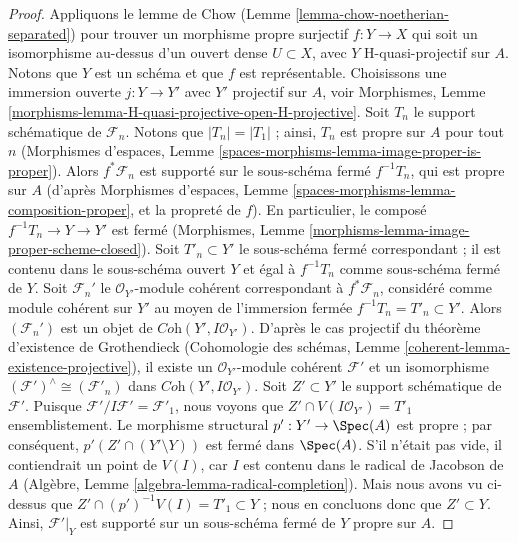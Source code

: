 \begin{proof}
\medskip\noindent
Appliquons le lemme de Chow (Lemme \ref{lemma-chow-noetherian-separated})
pour trouver un morphisme propre surjectif $f : Y \to X$ qui soit un isomorphisme
au-dessus d'un ouvert dense $U \subset X$, avec $Y$ H-quasi-projectif
sur $A$. Notons que $Y$ est un schéma et que $f$ est représentable.
Choisissons une immersion ouverte $j : Y \to Y'$ avec $Y'$ projectif sur $A$, voir
Morphismes, Lemme \ref{morphisms-lemma-H-quasi-projective-open-H-projective}.
Soit $T_n$ le support schématique de $\mathcal{F}_n$.
Notons que $|T_n| = |T_1|$ ; ainsi, $T_n$ est propre sur $A$ pour tout $n$
(Morphismes d'espaces, Lemme
\ref{spaces-morphisms-lemma-image-proper-is-proper}).
Alors $f^*\mathcal{F}_n$ est supporté sur le sous-schéma fermé
$f^{-1}T_n$, qui est propre sur $A$ (d'après
Morphismes d'espaces, Lemme \ref{spaces-morphisms-lemma-composition-proper},
et la propreté de $f$).
En particulier, le composé $f^{-1}T_n \to Y \to Y'$ est fermé
(Morphismes, Lemme \ref{morphisms-lemma-image-proper-scheme-closed}).
Soit $T'_n \subset Y'$ le sous-schéma fermé correspondant ;
il est contenu dans le sous-schéma ouvert $Y$ et égal à $f^{-1}T_n$
comme sous-schéma fermé de $Y$. Soit $\mathcal{F}_n'$
le $\mathcal{O}_{Y'}$-module cohérent correspondant à
$f^*\mathcal{F}_n$, considéré comme module cohérent sur $Y'$ au moyen de
l'immersion fermée $f^{-1}T_n = T'_n \subset Y'$.
Alors $(\mathcal{F}_n')$
est un objet de $\textit{Coh}(Y', I\mathcal{O}_{Y'})$.
D'après le cas projectif du théorème d'existence de Grothendieck
(Cohomologie des schémas, Lemme \ref{coherent-lemma-existence-projective}),
il existe un $\mathcal{O}_{Y'}$-module cohérent
$\mathcal{F}'$ et un isomorphisme
$(\mathcal{F}')^\wedge \cong (\mathcal{F}'_n)$ dans
$\textit{Coh}(Y', I\mathcal{O}_{Y'})$.
Soit $Z' \subset Y'$ le support schématique de $\mathcal{F}'$.
Puisque $\mathcal{F}'/I\mathcal{F}' = \mathcal{F}'_1$, nous voyons
que $Z' \cap V(I\mathcal{O}_{Y'}) = T'_1$ ensemblistement.
Le morphisme structural $p' : Y' \to \Spec(A)$ est propre ; par conséquent,
$p'(Z' \cap (Y' \setminus Y))$ est fermé dans $\Spec(A)$.
S'il n'était pas vide, il contiendrait un point de $V(I)$,
car $I$ est contenu dans le radical de Jacobson de $A$
(Algèbre, Lemme \ref{algebra-lemma-radical-completion}).
Mais nous avons vu ci-dessus que $Z' \cap (p')^{-1}V(I) = T'_1 \subset Y$ ;
nous en concluons donc que $Z' \subset Y$. Ainsi, $\mathcal{F}'|_Y$
est supporté sur un sous-schéma fermé de $Y$ propre sur $A$.


\end{proof}
